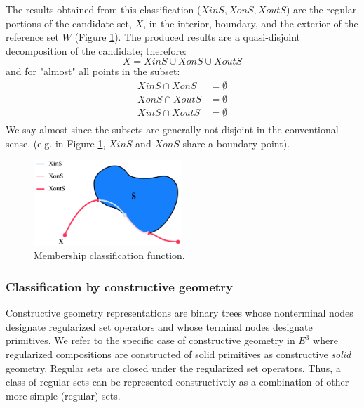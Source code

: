 \documentclass[a4paper,11pt,oneside]{article}
\begin{document}
The results obtained from this classification ($XinS, XonS, XoutS$) are the regular portions of the candidate set, $X$, in the interior, boundary, and the exterior of the reference set $W$ (Figure \ref{sec3.2:membership_classification}). The produced results are a quasi-disjoint decomposition of the candidate; therefore:
\begin{equation}
	X = XinS \cup XonS \cup XoutS
\end{equation}
and for "almost" all points in the subset:
\begin{align*}
	XinS \cap XonS  & = \emptyset \\
	XonS \cap XoutS & = \emptyset \\
	XinS \cap XoutS & = \emptyset \\
\end{align*}
We say almost since the subsets are generally not disjoint in the conventional sense. (e.g. in Figure \ref{sec3.2:membership_classification}, $XinS$ and $XonS$ share a boundary point). \cite{mansfield_1987}



\begin{figure}[ht]
	\begin{center}
		\includegraphics[width=0.5\textwidth]{section3/3.2/membership-classification.png}
	\end{center}
	\caption{Membership classification function.}
	\label{sec3.2:membership_classification}
\end{figure}

\subsubsection{Classification by constructive geometry}

Constructive geometry representations are binary trees whose nonterminal nodes designate regularized set operators and whose terminal nodes designate primitives.  We refer to the specific case of constructive geometry in $E^3$ where regularized compositions are constructed of solid primitives as constructive \textit{solid} geometry. Regular sets are closed under the regularized set operators. Thus, a class of regular sets can be represented constructively as a combination of other more simple (regular) sets. \cite{Requicha1978MathematicalFO}
\end{document}

